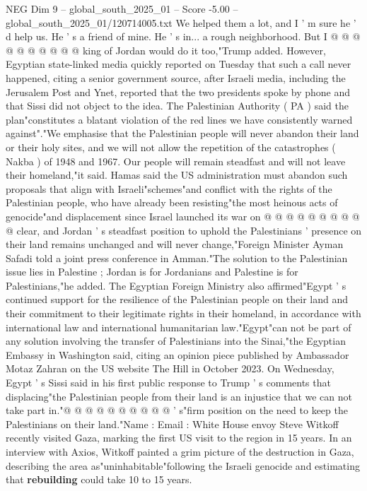 \begin{textsample}{NEG Dim 9 – global\_south\_2025\_01 – Score -5.00 – global\_south\_2025\_01/120714005.txt}
We helped them a lot, and I ' m sure he ' d help us.
He ' s a friend of mine.
He ' s in... a rough neighborhood.
But I @ @ @ @ @ @ @ @ @ @ king of Jordan would do it too,"Trump added.
However, Egyptian state-linked media quickly reported on Tuesday that such a call never happened, citing a senior government source, after Israeli media, including the Jerusalem Post and Ynet, reported that the two presidents spoke by phone and that Sissi did not object to the idea.
The Palestinian Authority ( PA ) said the plan"constitutes a blatant violation of the red lines we have consistently warned against"."We emphasise that the Palestinian people will never abandon their land or their holy sites, and we will not allow the repetition of the catastrophes ( Nakba ) of 1948 and 1967.
Our people will remain steadfast and will not leave their homeland,"it said.
Hamas said the US administration must abandon such proposals that align with Israeli"schemes"and conflict with the rights of the Palestinian people, who have already been resisting"the most heinous acts of genocide"and displacement since Israel launched its war on @ @ @ @ @ @ @ @ @ @ clear, and Jordan ' s steadfast position to uphold the Palestinians ' presence on their land remains unchanged and will never change,"Foreign Minister Ayman Safadi told a joint press conference in Amman."The solution to the Palestinian issue lies in Palestine ; Jordan is for Jordanians and Palestine is for Palestinians,"he added.
The Egyptian Foreign Ministry also affirmed"Egypt ' s continued support for the resilience of the Palestinian people on their land and their commitment to their legitimate rights in their homeland, in accordance with international law and international humanitarian law."Egypt"can not be part of any solution involving the transfer of Palestinians into the Sinai,"the Egyptian Embassy in Washington said, citing an opinion piece published by Ambassador Motaz Zahran on the US website The Hill in October 2023.
On Wednesday, Egypt ' s Sissi said in his first public response to Trump ' s comments that displacing"the Palestinian people from their land is an injustice that we can not take part in."@ @ @ @ @ @ @ @ @ @ ' s"firm position on the need to keep the Palestinians on their land."Name : Email : White House envoy Steve Witkoff recently visited Gaza, marking the first US visit to the region in 15 years.
In an interview with Axios, Witkoff painted a grim picture of the destruction in Gaza, describing the area as"uninhabitable"following the Israeli genocide and estimating that \textbf{rebuilding} could take 10 to 15 years.

\end{textsample}
